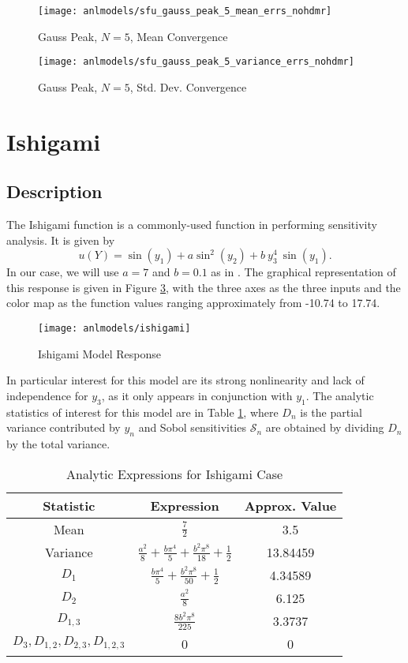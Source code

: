 \begin{figure}[H]
  \centering
  \texttt{[image: anlmodels/sfu\_gauss\_peak\_5\_mean\_errs\_nohdmr]}
  \caption{Gauss Peak, $N=5$, Mean Convergence}
  \label{fig:gauss peak mean errors 5}
\end{figure}
\begin{figure}[H]
  \centering
  \texttt{[image: anlmodels/sfu\_gauss\_peak\_5\_variance\_errs\_nohdmr]}
  \caption{Gauss Peak, $N=5$, Std. Dev. Convergence}
  \label{fig:gauss peak var errors 5}
\end{figure}




\section{Ishigami}
\subsection{Description}\label{mod:ishigami}
The Ishigami function \cite{ishigami} is a commonly-used function in performing sensitivity analysis.  It is
given by
\begin{equation}
  u(Y) = \sin(y_1) + a\sin^2(y_2) + b\ y_3^4\ \sin(y_1).
\end{equation}
In our case, we will use $a=7$ and $b=0.1$ as in \cite{ishigami2}.
The graphical representation of this response is given in Figure \ref{fig: ishigami}, with the three axes
as the three inputs and the color map as the function values ranging approximately from -10.74 to 17.74.
\begin{figure}[htb]
  \centering
  \texttt{[image: anlmodels/ishigami]}
  \caption{Ishigami Model Response}
  \label{fig: ishigami}
\end{figure}
In particular interest for this model are
its strong nonlinearity and lack of independence for $y_3$, as it only appears in conjunction with $y_1$.  The
analytic statistics of interest for this model are in Table \ref{tab:ishigami moments}, where $D_n$ is the
partial variance contributed by $y_n$ and Sobol sensitivities $\mathcal{S}_n$ are obtained by dividing $D_n$
by the total variance.

\begin{table}[H]
  \centering
  \begin{tabular}{c|c|c}
  Statistic & Expression & Approx. Value \\\hline
  Mean & $\frac{7}{2}$ & 3.5 \\
  Variance & $\frac{a^2}{8} + \frac{b\pi^4}{5} + \frac{b^2\pi^8}{18} + \frac{1}{2}$ & 13.84459 \\
  $D_1$ & $\frac{b\pi^4}{5} + \frac{b^2\pi^8}{50} + \frac{1}{2} $ &  4.34589 \\
  $D_2$ & $\frac{a^2}{8}$ & 6.125 \\
  $D_{1,3}$ & $\frac{8b^2\pi^8}{225}$ & 3.3737 \\
  $D_3,D_{1,2},D_{2,3},D_{1,2,3}$ & 0 & 0
  \end{tabular}
  \caption{Analytic Expressions for Ishigami Case}
  \label{tab:ishigami moments}
\end{table}


